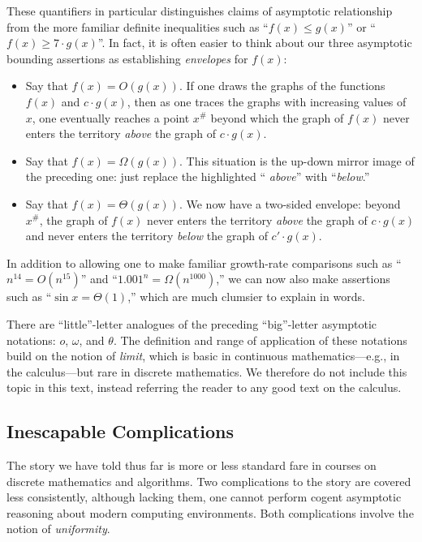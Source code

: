These quantifiers in particular distinguishes claims of asymptotic
relationship from the more familiar definite inequalities such as
``$f(x) \leq g(x)$'' or ``$f(x) \geq 7 \cdot g(x)$''.  In fact, it is
often easier to think about our three asymptotic bounding assertions
as establishing {\em envelopes} for $f(x)$:
\begin{itemize}
\item
Say that $f(x) = O(g(x))$.  If one draws the graphs of the functions
$f(x)$ and $c \cdot g(x)$, then as one traces the graphs with
increasing values of $x$, one eventually reaches a point $x^{\#}$
beyond which the graph of $f(x)$ never enters the territory {\em
  above} the graph of $c \cdot g(x)$.
\item
Say that $f(x) = \Omega(g(x))$.  This situation is the up-down mirror
image of the preceding one: just replace the highlighted ``{\em
above}'' with ``{\em below}.''
\item
Say that $f(x) = \Theta(g(x))$.  We now have a two-sided envelope:
beyond $x^{\#}$, the graph of $f(x)$ never enters the territory {\em
  above} the graph of $c \cdot g(x)$ and never enters the territory
{\em below} the graph of $c' \cdot g(x)$.
\end{itemize}
In addition to allowing one to make familiar growth-rate comparisons
such as ``$n^{14} = O(n^{15})$'' and ``$1.001^n = \Omega(n^{1000})$,''
we can now also make assertions such as ``$\sin x = \Theta(1)$,''
which are much clumsier to explain in words.

\medskip

%
There are ``little''-letter analogues of the preceding ``big''-letter
asymptotic notations: $o$, $\omega$, and $\theta$.  The definition and
range of application of these notations build on the notion of {\it
  limit}, which is basic in continuous mathematics---e.g., in the
calculus---but rare in discrete mathematics.  We therefore do not
include this topic in this text, instead referring the reader to any
good text on the calculus.

\subsection{Inescapable Complications}
\label{sec:asymptotic-complication}

The story we have told thus far is more or less standard fare in
courses on discrete mathematics and algorithms.  Two complications to
the story are covered less consistently, although lacking them, one
cannot perform cogent asymptotic reasoning about modern computing
environments.  Both complications involve the notion of {\em
  uniformity}. 

